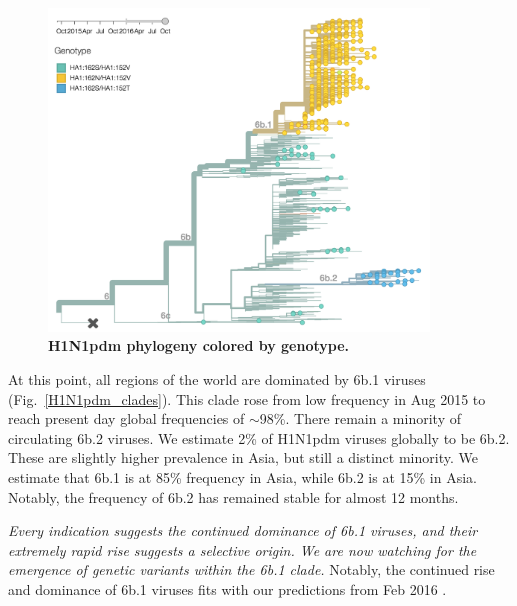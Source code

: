 \documentclass[11pt,oneside,letterpaper]{article}
\begin{document}
\begin{figure}[H]
	\centering
	\includegraphics[width=0.9\textwidth]{../figures/sep-2016/H1N1pdm_tree.png}
	\caption{\textbf{H1N1pdm phylogeny colored by genotype.}
	}
	\label{H1N1pdm_tree}
\end{figure}

\pagebreak

At this point, all regions of the world are dominated by 6b.1 viruses (Fig.\ \ref{H1N1pdm_clades}). This clade rose from low frequency in Aug 2015 to reach present day global frequencies of $\sim$98\%. There remain a minority of circulating 6b.2 viruses. We estimate 2\% of H1N1pdm viruses globally to be 6b.2. These are slightly higher prevalence in Asia, but still a distinct minority. We estimate that 6b.1 is at 85\% frequency in Asia, while 6b.2 is at 15\% in Asia. Notably, the frequency of 6b.2 has remained stable for almost 12 months.

\textit{Every indication suggests the continued dominance of 6b.1 viruses, and their extremely rapid rise suggests a selective origin. We are now watching for the emergence of genetic variants within the 6b.1 clade.} Notably, the continued rise and dominance of 6b.1 viruses fits with our predictions from Feb 2016 \cite{feb2016report}.
\end{document}
